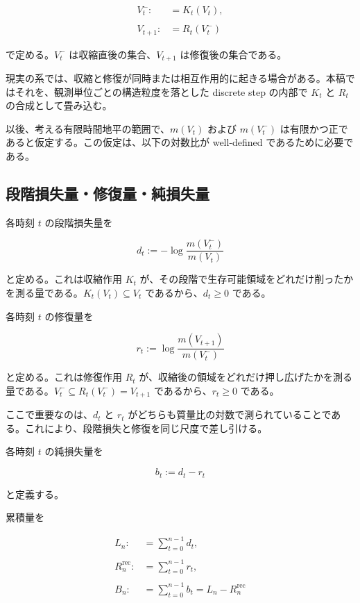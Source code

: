 \documentclass[12pt,a4paper]{article}
\begin{document}
\[
\begin{aligned}
V_{t}^- :&= K_{t}(V_{t}), \\
\qquad \\
V_{t+1} :&= R_{t}(V_{t}^-)
\end{aligned}
\]

で定める。\(V_{t}^-\) は収縮直後の集合、\(V_{t+1}\) は修復後の集合である。

現実の系では、収縮と修復が同時または相互作用的に起きる場合がある。本稿ではそれを、観測単位ごとの構造粒度を落とした discrete step の内部で \(K_{t}\) と \(R_{t}\) の合成として畳み込む。

以後、考える有限時間地平の範囲で、\(m(V_{t})\) および \(m(V_{t}^-)\) は有限かつ正であると仮定する。この仮定は、以下の対数比が well-defined であるために必要である。

\subsection{段階損失量・修復量・純損失量}\label{ux6bb5ux968eux640dux5931ux91cfux4feeux5fa9ux91cfux7d14ux640dux5931ux91cf}

各時刻 \(t\) の段階損失量を

\[
d_{t} := -\log \frac{m(V_{t}^-)}{m(V_{t})}
\]

と定める。これは収縮作用 \(K_{t}\) が、その段階で生存可能領域をどれだけ削ったかを測る量である。\(K_{t}(V_{t})\subseteq V_{t}\) であるから、\(d_{t}\ge 0\) である。

各時刻 \(t\) の修復量を

\[
r_{t} := \log \frac{m(V_{t+1})}{m(V_{t}^-)}
\]

と定める。これは修復作用 \(R_{t}\) が、収縮後の領域をどれだけ押し広げたかを測る量である。\(V_{t}^- \subseteq R_{t}(V_{t}^-)=V_{t+1}\) であるから、\(r_{t}\ge 0\) である。

ここで重要なのは、\(d_{t}\) と \(r_{t}\) がどちらも質量比の対数で測られていることである。これにより、段階損失と修復を同じ尺度で差し引ける。

\begin{definition}[純損失量]
各時刻 $t$ の純損失量を

$$
b_{t} := d_{t} - r_{t}
$$

と定義する。
\end{definition}

累積量を

\[
\begin{aligned}
L_{n} :&= \sum_{t=0}^{n-1} d_{t}, \\
\qquad \\
R_{n}^{\mathrm{rec}} :&= \sum_{t=0}^{n-1} r_{t}, \\
\qquad \\
B_{n} :&= \sum_{t=0}^{n-1} b_{t} = L_{n} - R_{n}^{\mathrm{rec}}
\end{aligned}
\]
\end{document}
